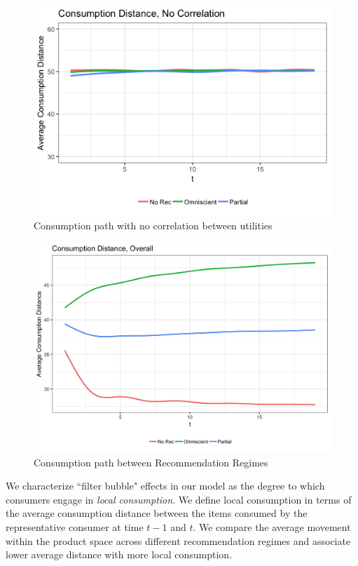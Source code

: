 \documentclass[sigconf]{acmart}
\begin{document}
\begin{figure}
\includegraphics[scale=0.4]{figures/consumption_dist_N_200T_20no_correlation}
\caption{Consumption path with no correlation between utilities}
\label{fig:no_correlation_consumption_path}
\end{figure}

\begin{figure}
\includegraphics[scale=0.1]{figures/consumption_dist_N_200T_20_overall}
\caption{Consumption path between Recommendation Regimes}
\label{fig:consumption_path_between_regimes}
\end{figure}

We characterize ``filter bubble" effects in our model as the degree to which consumers engage in \textit{local consumption}. We define local consumption in terms of the average consumption distance between the items consumed by the representative consumer at time $t-1$ and $t$. We compare the average movement within the product space across different recommendation regimes and associate lower average distance with more local consumption.
\end{document}
